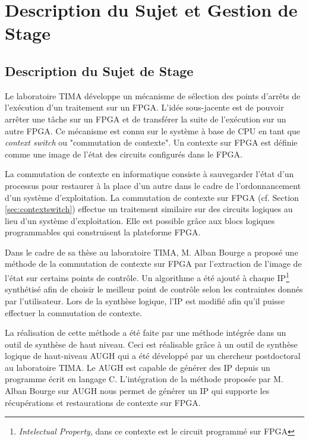 \chapter{Description du Sujet et Gestion de Stage}
\label{chap:sujet}
\OnehalfSpacing

\section{Description du Sujet de Stage}
\label{sec:sujet}

Le laboratoire TIMA développe un mécanisme de sélection des points
d'arrêts de l'exécution d'un traitement sur un FPGA. L'idée sous-jacente
est de pouvoir arrêter une tâche sur un FPGA et de transférer la suite de
l'exécution sur un autre FPGA.
Ce mécanisme est connu sur le système à base de CPU 
en tant que \emph{context switch} ou "commutation de contexte".
Un contexte sur FPGA est définie comme une image de l'état des circuits configurés dans le FPGA.

La commutation de contexte en informatique consiste à sauvegarder
l'état d'un processus pour restaurer à la place d'un autre dans le cadre de l'ordonnancement 
d'un système d'exploitation. La commutation de contexte sur FPGA (cf. Section \ref{sec:contextswitch}) 
effectue un traitement similaire sur des circuits logiques au lieu d'un système d'exploitation. 
Elle est possible grâce aux blocs logiques programmables
qui construisent la plateforme FPGA.

Dans le cadre de sa thèse au laboratoire TIMA, M. Alban Bourge a proposé une méthode de la commutation 
de contexte sur FPGA par l'extraction de l'image de l'état sur certains points de contrôle\cite{Bourge2015}. 
Un algorithme a été ajouté à chaque IP\footnote{\emph{Intelectual Property}, dans ce contexte est le circuit programmé sur FPGA} synthétisé
afin de choisir le meilleur point de contrôle selon les contraintes donnés par l'utilisateur.
Lors de la synthèse logique, l'IP est modifié afin qu'il puisse effectuer la commutation de contexte.

La réalisation de cette méthode a été faite par une méthode intégrée dans un outil de synthèse de haut niveau.
Ceci est réalisable grâce à un outil de synthèse logique de haut-niveau AUGH\cite{Prost2014} 
qui a été développé par un chercheur postdoctoral au laboratoire TIMA.
Le AUGH est capable de générer des IP 
depuis un programme écrit en langage C. L'intégration de la méthode proposée par M. Alban Bourge sur AUGH 
nous permet de générer un IP qui supporte les récupérations et restaurations de contexte sur FPGA.

